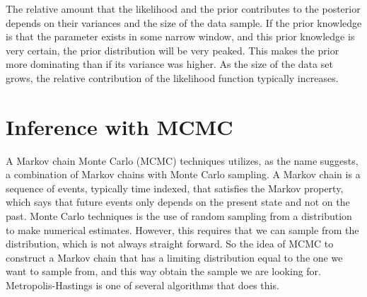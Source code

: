 The relative amount that the likelihood and the prior contributes to the posterior depends on their variances and the size of the data sample. If the prior knowledge is that the parameter exists in some narrow window, and this prior knowledge is very certain, the prior distribution will be very peaked. This makes the prior more dominating than if its variance was higher. As the size of the data set grows, the relative contribution of the likelihood function typically  increases. 










\section{Inference with MCMC}
\label{Bayesian}

A Markov chain Monte Carlo (MCMC) techniques utilizes, as the name suggests, a combination of Markov chains with Monte Carlo sampling. A Markov chain is a sequence of events, typically time indexed, that satisfies the Markov property, which says that future events only depends on the present state and not on the past. Monte Carlo techniques is the use of random sampling from a distribution to make numerical estimates. However, this requires that we can sample from the distribution, which is not always straight forward. So the idea of MCMC to construct a Markov chain that has a limiting distribution equal to the one we want to sample from, and this way obtain the sample we are looking for. Metropolis-Hastings is one of several algorithms that does this.

